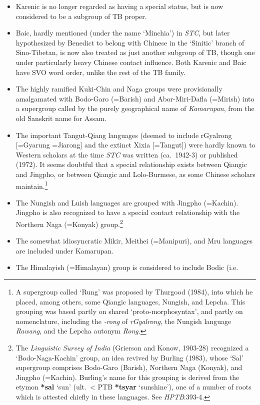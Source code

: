 \begin{itemize}
\item Karenic is no longer regarded as having a special status, but is now
considered to be a subgroup of TB proper.
\item Baic, hardly mentioned (under the name ‘Minchia’) in \textit{STC}, but later
hypothesized by Benedict to belong with Chinese in the ‘Sinitic’ branch of 
Sino-Tibetan, is now also treated as just another subgroup of TB, though one
under particularly heavy Chinese contact influence. Both Karenic and Baic have
SVO word order, unlike the rest of the TB family.
\item The highly ramified Kuki-Chin and Naga groups were provisionally
amalgamated with Bodo-Garo (=Barish) and Abor-Miri-Dafla (=Mirish) into a
supergroup called by the purely geographical name of \textit{Kamarupan}, from the old
Sanskrit name for Assam.
\item The important Tangut-Qiang languages (deemed to include rGyalrong
[=Gyarung =Jiarong] and the extinct Xixia [=Tangut]) were hardly known to Western
scholars at the time \textit{STC} was written (ca.~1942-3) or published (1972). It seems
doubtful that a special relationship exists between Qiangic and Jingpho, or
between Qiangic and Lolo-Burmese, as some Chinese scholars maintain.\footnote{A
supergroup called ‘Rung’ was proposed by Thurgood (1984), into which he placed,
among others, some Qiangic languages, Nungish, and Lepcha.  This grouping was
based partly on shared ‘proto-morphosyntax’, and partly on nomenclature,
including the \textit{-rong} of \textit{rGyalrong},
the Nungish language \textit{Rawang}, and the Lepcha autonym \textit{Rong}.}
\item The Nungish and Luish languages are grouped with Jingpho (=Kachin).  Jingpho
is also recognized to have a special contact relationship with the Northern Naga
(=Konyak) group.\footnote{The \textit{Linguistic Survey of India}
(Grierson and Konow, 1903-28) recognized a ‘Bodo-Naga-Kachin’ group,
an idea revived by Burling
(1983), whose ‘Sal’ supergroup comprises Bodo-Garo (Barish), Northern Naga
(Konyak), and Jingpho (=Kachin).  Burling’s name for this grouping is derived
from the etymon \textbf{*sal} ‘sun’ (ult.\ < PTB \textbf{*tsyar} ‘sunshine’), one of a number of
roots which is attested chiefly in these languages.  See \textit{HPTB}:393-4.}
\item The somewhat idiosyncratic Mikir, Meithei (=Manipuri), and Mru languages are
included under Kamarupan.
\item The Himalayish (=Himalayan) group is considered to include Bodic (i.e.\

\end{itemize}
